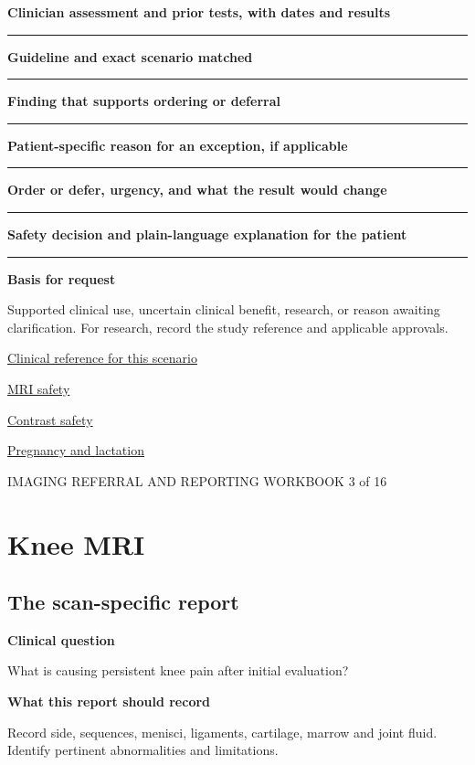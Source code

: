 \documentclass[11pt,a4paper]{article}
\newcommand{\record}[1]{\textbf{#1}\par\vspace{0.55\baselineskip}\hrule\vspace{0.35\baselineskip}}
\begin{document}
\record{Clinician assessment and prior tests, with dates and results}

\record{Guideline and exact scenario matched}

\record{Finding that supports ordering or deferral}

\record{Patient-specific reason for an exception, if applicable}

\record{Order or defer, urgency, and what the result would change}

\record{Safety decision and plain-language explanation for the patient}

\textbf{Basis for request}\par Supported clinical use, uncertain clinical benefit, research, or reason awaiting clarification. For research, record the study reference and applicable approvals.\par

\small\href{https://acsearch.acr.org/docs/69432/Narrative}{Clinical reference for this scenario}

\quad\href{https://www.acr.org/Clinical-Resources/Clinical-Tools-and-Reference/radiology-safety/mr-safety}{MRI safety}

\quad\href{https://www.acr.org/clinical-resources/clinical-tools-and-reference/contrast-manual}{Contrast safety}

\quad\href{https://pubmed.ncbi.nlm.nih.gov/28937575/}{Pregnancy and lactation}

\normalsize

\newpage

{\small IMAGING REFERRAL AND REPORTING WORKBOOK \hfill 3 of 16}

\section*{Knee MRI}

\subsection*{The scan-specific report}

\textbf{Clinical question}\par What is causing persistent knee pain after initial evaluation?\par

\textbf{What this report should record}\par Record side, sequences, menisci, ligaments, cartilage, marrow and joint fluid. Identify pertinent abnormalities and limitations.\par
\end{document}
